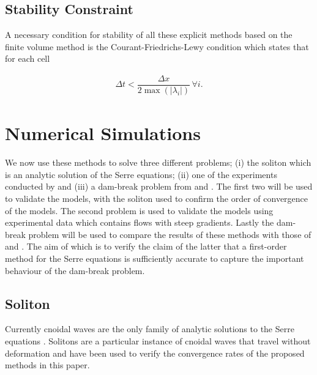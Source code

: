 \documentclass[SingleSpace,12pt,Proceedings]{Serre_ASCE}
\begin{document}
\subsection{Stability Constraint} %
A necessary condition for stability of all these explicit methods based on the finite volume method is the Courant-Friedrichs-Lewy condition \cite{Courant-etal-1928-32} which states that for each cell
\begin{linenomath*}
\begin{gather} \label{eq:CFLcond}
\Delta t < \dfrac{\Delta x}{2 \max\left(\left|\lambda_i\right|\right)} \, \forall i .
\end{gather}
\end{linenomath*} 
\section{Numerical Simulations}
\label{section:Numerical Simulations}
We now use these methods to solve three different problems; (i) the soliton which is an analytic solution of the Serre equations; (ii) one of the experiments conducted by  and (iii) a dam-break problem from  and . The first two will be used to validate the models, with the soliton used to confirm the order of convergence of the models. The second problem is used to validate the models using experimental data which contains flows with steep gradients. Lastly the dam-break problem will be used to compare the results of these methods with those of  and . The aim of which is to verify the claim of the latter that a first-order method for the Serre equations is sufficiently accurate to capture the important behaviour of the dam-break problem. 
\subsection{Soliton}
\label{section:Convergence Rate}
Currently cnoidal waves are the only family of analytic solutions to the Serre equations \cite{Carter-Cienfuegos-2010-259}. Solitons are a particular instance of cnoidal waves that travel without deformation and have been used to verify the convergence rates of the proposed methods in this paper. 
\end{document}
